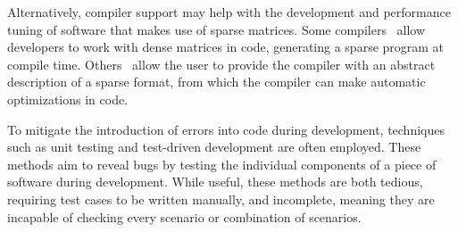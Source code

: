 Alternatively, compiler support may help with the development and performance tuning of software that makes use of sparse matrices.  Some compilers~\cite{bik1995, bik1996} allow developers to work with dense matrices in code, generating a sparse program at compile time.  Others~\cite{kotlyar1997} allow the user to provide the compiler with an abstract description of a sparse format, from which the compiler can make automatic optimizations in code.




To mitigate the introduction of errors into code during development, techniques such as unit testing and test-driven development are often employed.  These methods aim to reveal bugs by testing the individual components of a piece of software during development.  While useful, these methods are both tedious, requiring test cases to be written manually, and incomplete, meaning they are incapable of checking every scenario or combination of scenarios.

